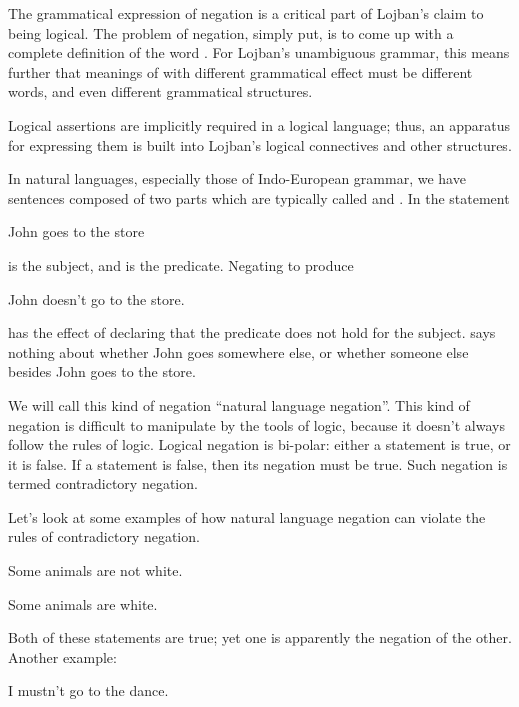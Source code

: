 The grammatical expression of negation is a critical part of
    Lojban's claim to being logical. The problem of negation,
    simply put, is to come up with a complete definition of the
    word . For Lojban's unambiguous grammar, this means
    further that meanings of  with different grammatical
    effect must be different words, and even different grammatical
    structures.

Logical assertions are implicitly required in a logical
    language; thus, an apparatus for expressing them is built into
    Lojban's logical connectives and other structures.

In natural languages, especially those of Indo-European
    grammar, we have sentences composed of two parts which are
    typically called  and . In the
    statement
\begin{example}
John goes to the store
\end{example}

 is the subject, and  is the
    predicate. Negating  to produce
\begin{example}
John doesn't go to the store.
\end{example}

{\noindent}has the effect of declaring that the predicate does not hold
    for the subject.  says nothing
    about whether John goes somewhere else, or whether someone else
    besides John goes to the store. 

We will call this kind of negation ``natural language
    negation''. This kind of negation is difficult to manipulate by
    the tools of logic, because it doesn't always follow the rules
    of logic. Logical negation is bi-polar: either a statement is
    true, or it is false. If a statement is false, then its
    negation must be true. Such negation is termed contradictory
    negation.

Let's look at some examples of how natural language negation
    can violate the rules of contradictory negation.
\begin{example}
Some animals are not white.
\end{example}

\begin{example}
Some animals are white.
\end{example}

Both of these statements are true; yet one is apparently the
    negation of the other. Another example:
\begin{example}
I mustn't go to the dance.
\end{example}

